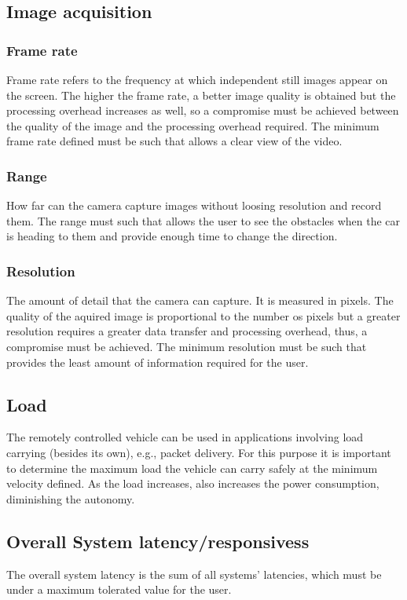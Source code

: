 \subsection{Image acquisition}
\label{sec:orgb6a5f66}
\subsubsection{Frame rate}
\label{sec:org5adf4ee}
Frame rate refers to the frequency at which independent still images appear on the screen. The higher the frame rate, a better image quality is obtained but the processing overhead increases as well, so a compromise must be achieved between the quality of the image and the processing overhead required. The minimum frame rate defined must be such that allows a clear view of the video.
\subsubsection{Range}
\label{sec:orgecb044c}
How far can the camera capture images without loosing resolution and record them. The range must such that allows the user to see the obstacles when the car is heading to them and provide enough time to change the direction.
\subsubsection{Resolution}
\label{sec:orgba87554}
The amount of detail that the camera can capture. It is measured in pixels. The quality of the aquired image is proportional to the number os pixels but a greater resolution requires a greater data transfer and processing overhead, thus, a compromise must be achieved. The minimum resolution must be such that provides the least amount of information required for the user. 
\subsection{Load}
\label{sec:orgca6a690}
The remotely controlled vehicle can be used in applications involving load carrying (besides its own), e.g., packet delivery. For this purpose it is important to determine the maximum load the vehicle can carry safely at the minimum velocity deﬁned. As the load increases, also increases the power consumption, diminishing the autonomy.
\subsection{Overall System latency/responsivess}
\label{sec:org7fd1829}
The overall system latency is the sum of all systems' latencies, which must be under a maximum tolerated value for the user.

